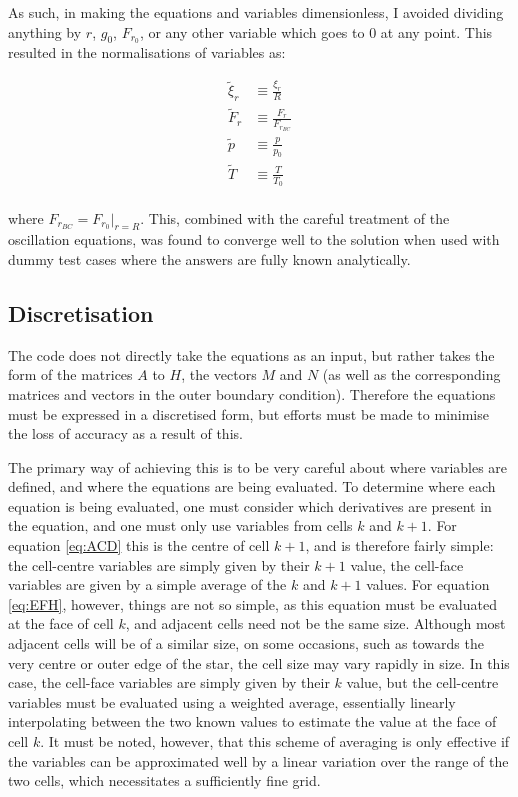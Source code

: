 \documentclass[11pt]{amsart}
\begin{document}
As such, in making the equations and variables dimensionless, I avoided dividing anything by $r$, $g_{0}$, $F_{r_{0}}$, or any other variable which goes to $0$ at any point.  This resulted in the normalisations of variables as:

\begin{align}
\tilde{\xi}_{r} &\equiv \frac{\xi_{r}}{R} \\
\tilde{F}_{r} &\equiv \frac{F_{r}}{F_{r_{BC}}} \\
\tilde{p} &\equiv \frac{p}{p_{0}} \\
\tilde{T} &\equiv \frac{T}{T_{0}}
\end{align}
\\
where $F_{r_{BC}} = F_{r_{0}} |_{r=R}$.  This, combined with the careful treatment of the oscillation equations, was found to converge well to the solution when used with dummy test cases where the answers are fully known analytically.



\subsection{Discretisation}   \label{Implement:Disc}

The code does not directly take the equations as an input, but rather takes the form of the matrices $A$ to $H$, the vectors $M$ and $N$ (as well as the corresponding matrices and vectors in the outer boundary condition).  Therefore the equations must be expressed in a discretised form, but efforts must be made to minimise the loss of accuracy as a result of this.

The primary way of achieving this is to be very careful about where variables are defined, and where the equations are being evaluated.  To determine where each equation is being evaluated, one must consider which derivatives are present in the equation, and one must only use variables from cells $k$ and $k+1$.  For equation \ref{eq:ACD} this is the centre of cell $k+1$, and is therefore fairly simple: the cell-centre variables are simply given by their $k+1$ value, the cell-face variables are given by a simple average of the $k$ and $k+1$ values.  For equation \ref{eq:EFH}, however, things are not so simple, as this equation must be evaluated at the face of cell $k$, and adjacent cells need not be the same size.  Although most adjacent cells will be of a similar size, on some occasions, such as towards the very centre or outer edge of the star, the cell size may vary rapidly in size.  In this case, the cell-face variables are simply given by their $k$ value, but the cell-centre variables must be evaluated using a weighted average, essentially linearly interpolating between the two known values to estimate the value at the face of cell $k$.  It must be noted, however, that this scheme of averaging is only effective if the variables can be approximated well by a linear variation over the range of the two cells, which necessitates a sufficiently fine grid.
\end{document}
